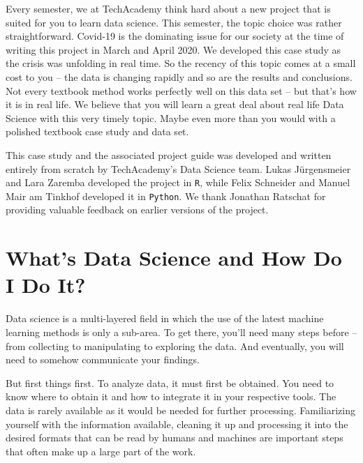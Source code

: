 \documentclass[
  11pt,
]{article}
\begin{document}
Every semester, we at TechAcademy think hard about a new project that is suited for you to learn data science. This semester, the topic choice was rather straightforward. Covid-19 is the dominating issue for our society at the time of writing this project in March and April 2020. We developed this case study as the crisis was unfolding in real time. So the recency of this topic comes at a small cost to you -- the data is changing rapidly and so are the results and conclusions. Not every textbook method works perfectly well on this data set -- but that's how it is in real life. We believe that you will learn a great deal about real life Data Science with this very timely topic. Maybe even more than you would with a polished textbook case study and data set.

This case study and the associated project guide was developed and written entirely from scratch by TechAcademy's Data Science team. Lukas Jürgensmeier and Lara Zaremba developed the project in \texttt{R}, while Felix Schneider and Manuel Mair am Tinkhof developed it in \texttt{Python}. We thank Jonathan Ratschat for providing valuable feedback on earlier versions of the project.

\hypertarget{whats-data-science-and-how-do-i-do-it}{%
\section{What's Data Science and How Do I Do It?}\label{whats-data-science-and-how-do-i-do-it}}

Data science is a multi-layered field in which the use of the latest machine learning methods is only a sub-area. To get there, you'll need many steps before -- from collecting to manipulating to exploring the data. And eventually, you will need to somehow communicate your findings.

But first things first. To analyze data, it must first be obtained. You need to know where to obtain it and how to integrate it in your respective tools. The data is rarely available as it would be needed for further processing. Familiarizing yourself with the information available, cleaning it up and processing it into the desired formats that can be read by humans and machines are important steps that often make up a large part of the work.
\end{document}
